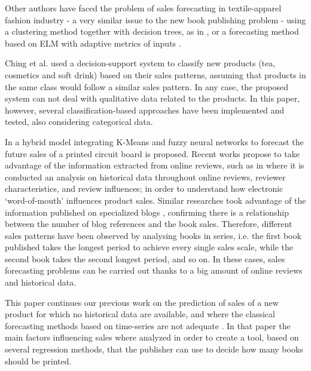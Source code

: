 \documentclass[a4paper,10pt,onecolumn,preprint,3p]{elsarticle}
\begin{document}
Other authors have faced the problem of sales forecasting in textile-apparel 
fashion industry - a very similar issue to the new book publishing problem - 
using a clustering method together with decision trees, as in \cite{SThomassey2014}, or a forecasting method based on ELM with adaptive metrics of inputs \cite{Xia2012}.

Ching et al. \cite{ChingChin2010} used a decision-support system to classify new 
products (tea, cosmetics and soft drink) based on their sales patterns, assuming 
that products in the same class would follow a similar sales pattern. 
In any case, the proposed system can not deal with qualitative data related to the products. 
In this paper, however, several classification-based approaches have been implemented and tested, also considering categorical data.



In \cite{Chang2009} a hybrid model integrating K-Means and fuzzy neural networks 
to forecast the future sales of a printed circuit board is proposed.
Recent works propose to take advantage of the information extracted from online reviews, such as in \cite{ChernWSF15} where it is conducted an analysis on historical data throughout online reviews, reviewer characteristics, and review influences; in order to understand how electronic `word-of-mouth' influences product sales.
Similar researches took advantage of the information published on specialized 
blogs \cite{Moon2010ICSSSM,Moon2010ICEC}, confirming there is a relationship between the number of blog references and the book sales. Therefore, different sales patterns have been observed by analysing books in series, i.e. the first book published takes the longest period to achieve every single sales scale, while the second book takes the second longest period, and so on.
In these cases, sales forecasting problems can be carried out thanks to a big 
amount of online reviews and historical data.


This paper continues our previous work on the prediction of sales of a new product for which no historical data are available, and where the classical forecasting methods based on time-series are not adequate \cite{Castillo2016books}. In that paper the main factors influencing sales where 
analyzed in order to create a tool, based on several regression methods, that the publisher can use to decide how many books should be printed.
\end{document}
